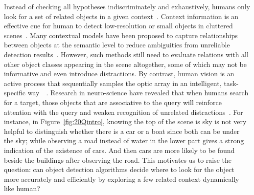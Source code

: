 Instead of checking all hypotheses indiscriminately and exhaustively, humans only look for a set of related objects in a given context~\cite{biederman1982scene, hock1974contextual}. Context information is an effective cue for human to detect low-resolution or small objects in cluttered scenes~\cite{parikh2012exploring}. Many contextual models have been proposed to capture relationships between objects at the semantic level to reduce ambiguities from unreliable detection results~\cite{gould2009decomposing, galleguillos2010context, ladicky2010graph}. %
However, such methods still need to evaluate relations with all other object classes appearing in the scene altogether, some of which may not be informative and even introduce distractions.  By contrast, human vision is an active process that sequentially samples the optic array in an intelligent, task-specific way~\cite{najemnik2005optimal}~. Research in neuro-science have revealed that when humans search for a target, those objects that are associative to the query will reinforce attention with the query and weaken recognition of unrelated distractions~\cite{moores2003associative}. 
For instance, in Figure~\ref{fig:20Qintro}, knowing the top of the scene is sky is not very helpful to distinguish whether there is a car or a boat since both can be under the sky; 
while observing a road instead of water in the lower part gives a strong indication of the existence of cars. And then cars are more likely to be found beside the buildings after observing the road.%
This motivates us to raise the question: can object detection algorithms decide where to look for the object more accurately and efficiently by exploring a few related context dynamically like human?

